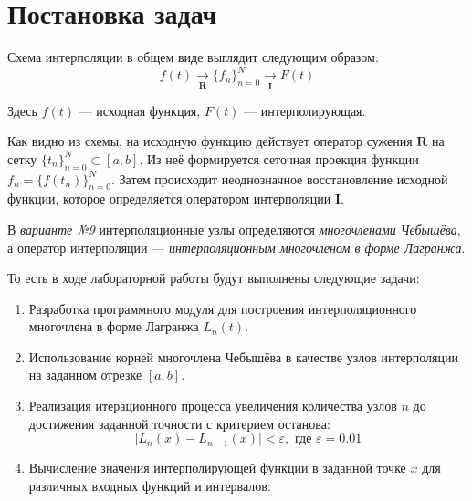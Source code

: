 \section{Постановка задач}

Схема интерполяции в общем виде выглядит следующим образом:
\[
  f(t)\xrightarrow[\mathbf{R}]{}\{f_n\}^N_{n=0}\xrightarrow[\mathbf{I}]{}F(t)
\]

Здесь \( f(t) \) --- исходная функция, \( F(t) \) --- интерполирующая.

Как видно из схемы, на исходную функцию действует оператор сужения \( \mathbf{R} \) на сетку \( \{t_n\}^N_{n=0}\subset [a,b] \). Из неё формируется сеточная проекция функции \( f_n=\{f(t_n)\}_{n=0}^N \). Затем происходит неоднозначное восстановление исходной функции, которое определяется оператором интерполяции \( \mathbf{I} \).

В \textit{варианте №9} интерполяционные узлы определяются \textit{многочленами Чебышёва}, а оператор интерполяции --- \textit{интерполяционным многочленом в форме Лагранжа}.

То есть в ходе лабораторной работы будут выполнены следующие задачи:

\begin{enumerate}
    \item Разработка программного модуля для построения интерполяционного многочлена в форме Лагранжа $L_n(t)$.
    \item Использование корней многочлена Чебышёва в качестве узлов интерполяции на заданном отрезке $[a, b]$.
    \item Реализация итерационного процесса увеличения количества узлов $n$ до достижения заданной точности с критерием останова:
    $$|L_n(x) - L_{n-1}(x)| < \varepsilon, \text{ где } \varepsilon = 0.01$$
    \item Вычисление значения интерполирующей функции в заданной точке $x$ для различных входных функций и интервалов.
\end{enumerate}